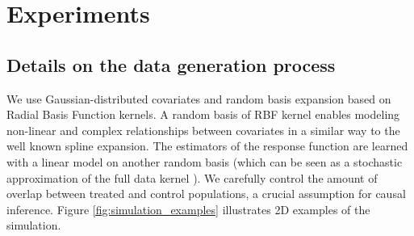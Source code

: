 \documentclass[11pt]{article}
\let\cite=\supercite
\begin{document}
\section{Experiments}

\subsection{Details on the data generation process}
\label{apd:experiments:generation}

We use Gaussian-distributed covariates and random basis expansion based on
Radial Basis Function kernels. A random basis of RBF kernel enables modeling
non-linear and complex relationships between covariates in a similar way to the
well known spline expansion. The estimators of the response function are learned
with a linear model on another random basis (which can be seen as a stochastic
approximation of the full data kernel \cite{rahimi_random_2008}). We carefully
control the amount of overlap between treated and control populations, a crucial
assumption for causal inference. Figure \ref{fig:simulation_examples}
illustrates 2D examples of the simulation.
\end{document}
